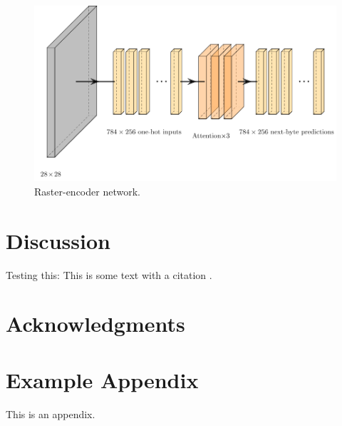 \documentclass[11pt]{article}
\begin{document}
\begin{figure}[t]
  \centering
  \includegraphics[width=2\columnwidth]{diagrams/raster.pdf}
  \caption{Raster-encoder network.}
  \label{fig:auto}
\end{figure}


\section{Discussion}

Testing this: This is some text with a citation \citep{lazaridou-etal-2020-multi}.

\section*{Acknowledgments}



\appendix

\section{Example Appendix}
\label{sec:appendix}

This is an appendix.
\end{document}
